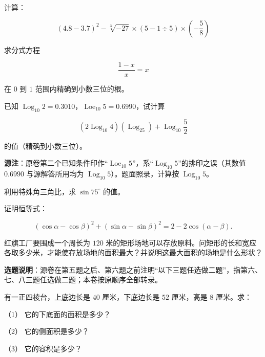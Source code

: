 \begin{question}
计算：

\nopagebreak[4]
\[
(4.8-3.7)^2-\sqrt[3]{-27}\times\left(5-1\div5\right)\times\left(-\frac58\right)
\]

\end{question}
\begin{question}
求分式方程

\nopagebreak[4]
\[
\frac{1-x}{x}=x
\]

在 $0$ 到 $1$ 范围内精确到小数三位的根。

\end{question}
\begin{question}
已知 $\operatorname{Log}_{10}2=0.3010$，$\operatorname{Loe}_{10}5=0.6990$，试计算

\nopagebreak[4]
\[
(2\operatorname{Log}_{10}4)(\operatorname{Log}_25)+\operatorname{Log}_{10}\frac52
\]

的值（精确到小数三位）。

\begin{gktip}
\textbf{源注}：原卷第二个已知条件印作“$\operatorname{Loe}_{10}5$”，系“$\operatorname{Log}_{10}5$”的排印之误（其数值 $0.6990$ 与源解答所用均为 $\operatorname{Log}_{10}5$）。题面照录，计算按 $\operatorname{Log}_{10}5$。
\end{gktip}

\end{question}
\begin{question}
利用特殊角三角比，求 $\sin75^\circ$ 的值。

\end{question}
\begin{question}
证明恒等式：

\nopagebreak[4]
\[
(\cos\alpha-\cos\beta)^2+(\sin\alpha-\sin\beta)^2=2-2\cos(\alpha-\beta).
\]

\end{question}
\begin{question}
红旗工厂要围成一个周长为 $120$ 米的矩形场地可以存放原料。问矩形的长和宽应各取多少米，才能使存放场地的面积最大？并说明这最大面积的场地是什么形状？

\begin{gktip}
\textbf{选题说明}：源卷在第五题之后、第六题之前注明“以下三题任选做二题”，指第六、七、八三题任选做二题；本卷按原顺序全部转录。
\end{gktip}

\end{question}
\begin{question}
有一正四棱台，上底边长是 $40$ 厘米，下底边长是 $52$ 厘米，高是 $8$ 厘米。求：

（1） 它的下底面的面积是多少？

（2） 它的侧面积是多少？

（3） 它的容积是多少？

\end{question}
